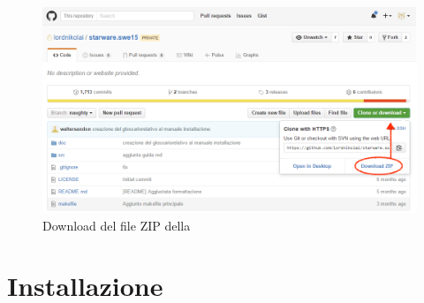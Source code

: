 \documentclass[12pt,a4paper]{article}
\begin{document}
		\begin{figure}[H]	
			\centering
			\includegraphics[width=1.0\linewidth]{../img/manualeInstallazione/downloadRepo.png}
			\caption{Download del file ZIP della }
			\label{Download dell file ZIP della repository}
		\end{figure}
	
	\newpage
	\section{Installazione}\label{install}
		
\end{document}
